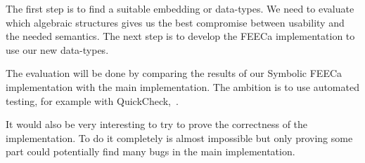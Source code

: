 \documentclass{scrartcl}
\begin{document}



The first step is to find a suitable embedding or data-types. We need to evaluate
which algebraic structures gives us the best compromise between usability and
the needed semantics. The next step is to develop the FEECa implementation to
use our new data-types.

The evaluation will be done by comparing the results of our Symbolic FEECa
implementation with the main implementation.
The ambition is to use automated
testing, for example with QuickCheck,~\cite{claessen_quickcheck_2000}.

It would also be very interesting to try to prove the correctness of the
implementation. To do it completely is almost impossible but only proving some
part could potentially find many bugs in the main implementation.











\end{document}
